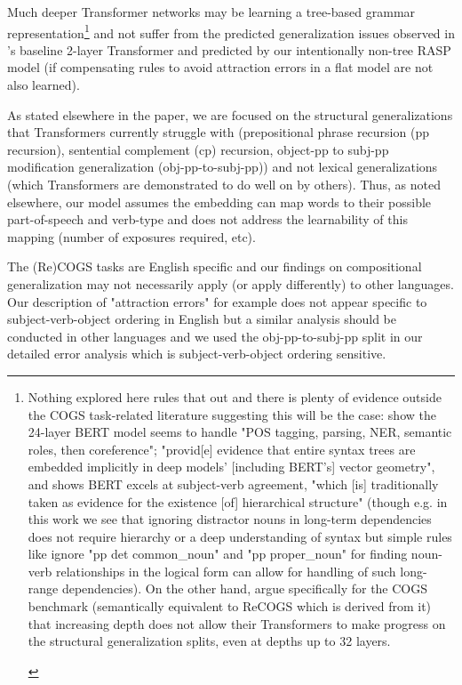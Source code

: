 \documentclass[11pt]{article}
\begin{document}
Much deeper Transformer networks may be learning a tree-based grammar representation\footnote{\begin{footnotesize}Nothing explored here rules that out and there is plenty of evidence outside the COGS task-related literature suggesting this will be the case: \citep{tenney2019bertrediscoversclassicalnlp} show the 24-layer BERT model seems to handle "POS tagging, parsing, NER, semantic roles, then coreference"; \citep{hewitt-manning-2019-structural} "provid[e] evidence that entire syntax trees are embedded implicitly in deep models’ [including BERT's] vector geometry", and \citep{goldberg2019assessingbertssyntacticabilities} shows BERT excels at subject-verb agreement, "which [is] traditionally taken as evidence for
the existence [of] hierarchical structure" (though e.g. in this work we see that ignoring distractor nouns in long-term dependencies does not require hierarchy or a deep understanding of syntax but simple rules like ignore "pp det common\_noun" and "pp proper\_noun" for finding noun-verb relationships in the logical form can allow for handling of such long-range dependencies). On the other hand, \citep{petty2024impactdepthcompositionalgeneralization} argue specifically for the COGS benchmark (semantically equivalent to ReCOGS which is derived from it) that increasing depth does not allow their Transformers to make progress on the structural generalization splits, even at depths up to 32 layers.
\end{footnotesize}
} and not suffer from the predicted generalization issues observed in \citep{Wu2023}'s baseline 2-layer Transformer and predicted by our intentionally non-tree RASP model (if compensating rules to avoid attraction errors in a flat model are not also learned).

As stated elsewhere in the paper, we are focused on the structural generalizations that Transformers currently struggle with (prepositional phrase recursion (pp recursion), sentential complement (cp) recursion, object-pp to subj-pp modification generalization (obj-pp-to-subj-pp)) and not lexical generalizations (which Transformers are demonstrated to do well on by others). Thus, as noted elsewhere, our model assumes the embedding can map words to their possible part-of-speech and verb-type and does not address the learnability of this mapping (number of exposures required, etc).

The (Re)COGS tasks are English specific and our findings on compositional generalization may not necessarily apply (or apply differently) to other languages. Our description of "attraction errors" for example does not appear specific to subject-verb-object ordering in English but a similar analysis should be conducted in other languages and we used the obj-pp-to-subj-pp split in our detailed error analysis which is subject-verb-object ordering sensitive.
\end{document}
